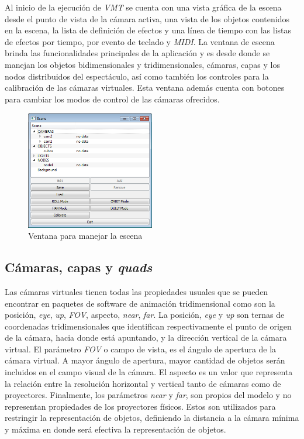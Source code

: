 Al inicio de la ejecución de \emph{VMT} se cuenta con una vista gráfica de la escena desde el punto de vista de la cámara activa, una vista de los objetos contenidos en la escena, la lista de definición de efectos y una línea de tiempo con las listas de efectos por tiempo, por evento de teclado y \emph{MIDI}.
La ventana de escena brinda las funcionalidades principales de la aplicación y es desde donde se manejan los objetos bidimensionales y tridimensionales, cámaras, capas y los nodos distribuidos del espectáculo, así como también los controles para la calibración de las cámaras virtuales.
Esta ventana además cuenta con botones para cambiar los modos de control de las cámaras ofrecidos.

\begin{figure}[H]
  \centering
    \includegraphics[width=0.5\textwidth]{./Cap5_vmt/vmt_scene.png}
  \caption{Ventana para manejar la escena}
  \label{fig:VMT-SceneWindow}
\end{figure}

\subsection{Cámaras, capas y \emph{quads}}
Las cámaras virtuales tienen todas las propiedades usuales que se pueden encontrar en paquetes de software de animación tridimensional como son la posición, \emph{eye}, \emph{up}, \emph{FOV}, aspecto, \emph{near}, \emph{far}.
La posición, \emph{eye} y \emph{up} son ternas de coordenadas tridimensionales que identifican respectivamente el punto de origen de la cámara, hacia donde está apuntando, y la dirección vertical de la cámara virtual.
El parámetro \emph{FOV} o campo de vista, es el ángulo de apertura de la cámara virtual. A mayor ángulo de apertura, mayor cantidad de objetos serán incluidos en el campo visual de la cámara.
El aspecto es un valor que representa la relación entre la resolución horizontal y vertical tanto de cámaras como de proyectores.
Finalmente, los parámetros \emph{near} y \emph{far}, son propios del modelo y no representan propiedades de los proyectores físicos. Estos son utilizados para restringir la representación de objetos, definiendo la distancia a la cámara mínima y máxima en donde será efectiva la representación de objetos.

